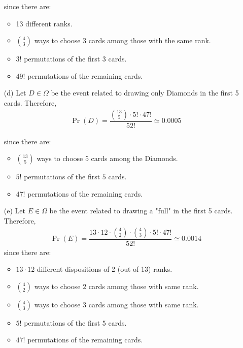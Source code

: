 \begin{itemize}
	since there are:
	\begin{itemize}
		\item 13 different ranks.
		\item $\binom{4}{3}$ ways to choose 3 cards among those with the same rank.
		\item $3!$ permutations of the first $3$ cards.
		\item $49!$ permutations of the remaining cards.
	\end{itemize}
	
	\item[(d)] Let $D \in \Omega$ be the event related to drawing only Diamonds in the first 5 cards. Therefore,
	\begin{align*}
		\Pr(D) = \dfrac{\binom{13}{5} \cdot 5! \cdot 47!}{52!} \simeq 0.0005
	\end{align*}
	
	since there are:
	\begin{itemize}
		\item $\binom{13}{5}$ ways to choose $5$ cards among the Diamonds.
		\item $5!$ permutations of the first $5$ cards.
		\item $47!$ permutations of the remaining cards.
	\end{itemize}
	
	\item[(e)] Let $E \in \Omega$ be the event related to drawing a "full" in the first 5 cards. Therefore,
	\begin{align*}
		\Pr(E) = \dfrac{13 \cdot 12 \cdot \binom{4}{2} \cdot \binom{4}{3} \cdot 5! \cdot 47!}{52!} \simeq 0.0014
	\end{align*}
	since there are:
	\begin{itemize}
		\item $13 \cdot 12$ different dispositions of 2 (out of 13) ranks.
		\item $\binom{4}{2}$ ways to choose $2$ cards among those with same rank.
		\item $\binom{4}{3}$ ways to choose $3$ cards among those with same rank.
		\item $5!$ permutations of the first $5$ cards.
		\item $47!$ permutations of the remaining cards.
	\end{itemize}		
\end{itemize}


